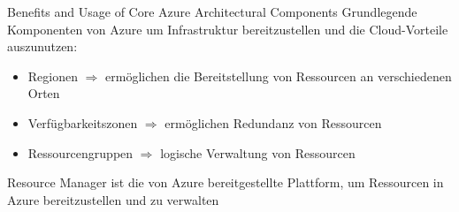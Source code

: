 \begin{flashcard}[\ ]{Benefits and Usage of Core Azure Architectural Components}
    Grundlegende Komponenten von Azure um Infrastruktur bereitzustellen und die Cloud-Vorteile auszunutzen:
    \begin{itemize}
        \item Regionen $\Rightarrow$ ermöglichen die Bereitstellung von Ressourcen an verschiedenen Orten
        \item Verfügbarkeitszonen $\Rightarrow$ ermöglichen Redundanz von Ressourcen
        \item Ressourcengruppen $\Rightarrow$ logische Verwaltung von Ressourcen
    \end{itemize}

    \vspace{5mm}
    Resource Manager ist die von Azure bereitgestellte Plattform, um Ressourcen in Azure bereitzustellen und zu verwalten

\end{flashcard}
